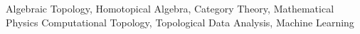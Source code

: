 
        {Algebraic Topology, Homotopical Algebra, Category Theory, Mathematical Physics}
		{Computational Topology, Topological Data Analysis, Machine Learning}